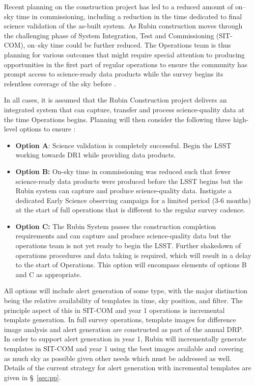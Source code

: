 Recent planning on the construction project has led to a reduced amount of on--sky time in commissioning, including a reduction in the time dedicated to final science validation of the as-built system. 
As Rubin construction moves through the challenging phase of System Integration, Test and Commissioning (SIT-COM), on--sky time could be further reduced. 
The Operations team is thus planning for various outcomes that might require special attention to producing \es opportunities in the first part of regular operations to ensure the community has prompt access to science-ready data products while the survey begins its relentless coverage of the sky before \drone.

In all cases, it is assumed that the Rubin Construction project delivers an integrated system that can capture, transfer and process science-quality data at the time Operations begins.
Planning will then consider the following three high-level options to ensure \es:
\begin{itemize}
\item \textbf{Option A}: 
Science validation is completely successful.
Begin the LSST working towards DR1 while providing \es data products. 
\item \textbf{Option B:} 
On-sky time in commissioning was reduced such that fewer science-ready data products were produced before the LSST begins but the Rubin system can capture and produce science-quality data. 
Instigate a dedicated Early Science observing campaign for a limited period (3-6 months) at the start of full operations that is different to the regular survey cadence. 
\item \textbf{Option C:} 
The Rubin System  passes the construction completion requirements and can capture and produce science-quality data but the operations team is not yet ready to begin the LSST. 
Further shakedown of operations procedures and data taking is required, which will result in a delay to the start of Operations. 
This option will encompass elements of options B and C as appropriate. 
\end{itemize}

All options will include alert generation of some type, with the major distinction being the relative availability of templates in time, sky position, and filter. 
The principle aspect of this in SIT-COM and year 1 operations is incremental template generation. 
In full survey operations, template images for difference image analysis and alert generation are constructed as part of the annual DRP. 
In order to support alert generation in year 1, Rubin will incrementally generate templates in SIT-COM and year 1 using the best images available and covering as much sky as possible given other needs which must be addressed as well. 
Details of the current strategy for alert generation  with incremental templates are given in  \S~\ref{sec:pp}.  

